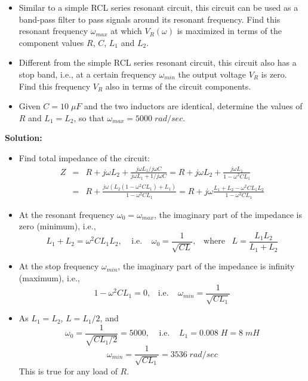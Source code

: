 \begin{enumerate}
  \begin{itemize}
  \item Similar to a simple RCL series resonant circuit, this circuit
    can be used as a band-pass filter to pass signals around its resonant 
    frequency. Find this resonant frequency $\omega_{max}$ at which 
    $V_R(\omega)$ is maximized in terms of the component values $R$, 
    $C$, $L_1$ and $L_2$. 

  \item Different from the simple RCL series resonant circuit, this 
    circuit also has a stop band, i.e., at a certain frequency 
    $\omega_{min}$ the output voltage $V_R$ is zero. Find this frequency 
    $V_R$ also in terms of the circuit components. 

  \item Given $C=10\;\mu F$ and the two inductors are identical, determine
    the values of $R$ and $L_1=L_2$, so that $\omega_{max}=5000\;rad/sec$.

  \end{itemize}


  {\bf Solution:}
  \begin{itemize}
  \item Find total impedance of the circuit:
    \begin{eqnarray}
      Z&=&R+j\omega L_2+\frac{j\omega L_1/j\omega C}{j\omega L_1+1/j\omega C}
      =R+j\omega L_2+\frac{j\omega L_1}{1-\omega^2 CL_1}
      \nonumber \\
      &=&R+\frac{j\omega(L_2(1-\omega^2CL_1)+L_1)}{1-\omega^2 CL_1}
      =R+j\omega \frac{L_1+L_2-\omega^2CL_1L_2}{1-\omega^2CL_1}
      \nonumber 
    \end{eqnarray}
  \item At the resonant frequency $\omega_0=\omega_{max}$, the imaginary 
    part of the impedance is zero (minimum), i.e.,
    \[	L_1+L_2=\omega^2CL_1L_2,\;\;\;\;\mbox{i.e.}\;\;\;\;
    \omega_0=\frac{1}{\sqrt{CL}},\;\;\;\mbox{where}\;\;\;
    L=\frac{L_1L_2}{L_1+L_2}
    \]
  \item At the stop frequency $\omega_{min}$, the imaginary part of the 
    impedance is infinity (maximum), i.e.,
    \[	1-\omega^2CL_1=0, \;\;\;\mbox{i.e.}\;\;\;\;
    \omega_{min}=\frac{1}{\sqrt{CL_1}}	\]
    
  \item As $L_1=L_2$, $L=L_1/2$, and
    \[ \omega_0=\frac{1}{\sqrt{CL_1/2}}=5000,\;\;\;\;\mbox{i.e.}\;\;\;\;
    L_1=0.008\;H=8\;mH	\]
    \[ \omega_{min}=\frac{1}{\sqrt{CL_1}}=3536\;rad/sec	\]
    This is true for any load of $R$.


\end{itemize}
\end{enumerate}

